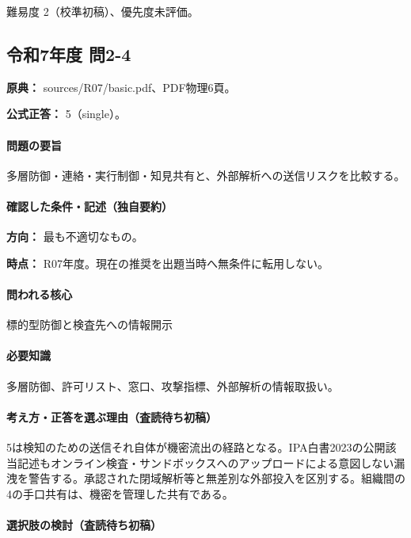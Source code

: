 \par 難易度 2（校準初稿）、優先度未評価。

\subsection{令和7年度 問2-4}
\label{q:r07-reg-basic-2-4}

\noindent\textbf{原典：} sources/R07/basic.pdf、PDF物理6頁。

\textbf{公式正答：} 5（single）。

\paragraph{問題の要旨} 多層防御・連絡・実行制御・知見共有と、外部解析への送信リスクを比較する。

\paragraph{確認した条件・記述（独自要約）}\mbox{}\par

\noindent\textbf{方向：} 最も不適切なもの。\par

\noindent\textbf{時点：} R07年度。現在の推奨を出題当時へ無条件に転用しない。\par

\paragraph{問われる核心} 標的型防御と検査先への情報開示

\paragraph{必要知識} 多層防御、許可リスト、窓口、攻撃指標、外部解析の情報取扱い。

\paragraph{考え方・正答を選ぶ理由（査読待ち初稿）} 5は検知のための送信それ自体が機密流出の経路となる。IPA白書2023の公開該当記述もオンライン検査・サンドボックスへのアップロードによる意図しない漏洩を警告する。承認された閉域解析等と無差別な外部投入を区別する。組織間の4の手口共有は、機密を管理した共有である。

\paragraph{選択肢の検討（査読待ち初稿）}\mbox{}\par

